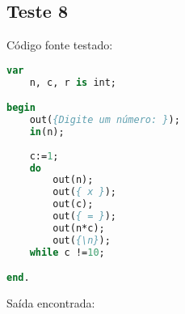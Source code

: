 \documentclass[11pt]{article}
\begin{document}
\subsection{Teste 8}

Código fonte testado:
\begin{lstlisting}[language=Pascal]
var
    n, c, r is int;

begin
    out({Digite um número: });
    in(n);
    
    c:=1;
    do
        out(n);
        out({ x });
        out(c);
        out({ = });
        out(n*c);
        out({\n});
    while c !=10;

end.
\end{lstlisting}
	
Saída encontrada:
\begin{verbatim}
	
\end{verbatim}
\end{document}
